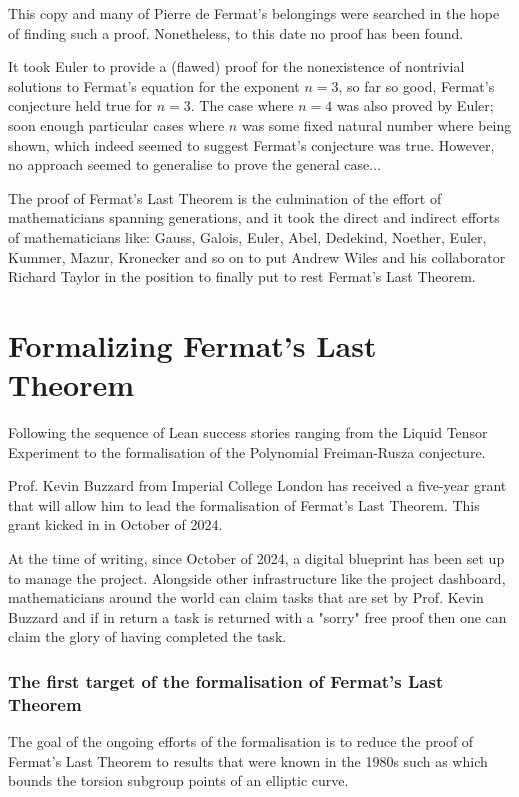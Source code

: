 This copy and many of Pierre de Fermat's belongings were searched in the hope of finding such a proof. Nonetheless, to this date no proof has been found.


It took Euler to provide a (flawed) proof for the nonexistence of nontrivial solutions to Fermat's equation for the exponent $n = 3$, so far so good, Fermat's conjecture held true for $n = 3$.
The case where $n = 4$ was also proved by Euler; soon enough particular cases where $n$ was some fixed natural number where being shown, which indeed seemed to suggest Fermat's conjecture was true.
However, no approach seemed to generalise to prove the general case...

The proof of Fermat's Last Theorem is the culmination of the effort of mathematicians spanning generations, and it took the direct and indirect efforts of mathematicians like: 
Gauss, Galois, Euler, Abel, Dedekind, Noether, Euler, Kummer, Mazur, Kronecker and so on to put Andrew Wiles and his collaborator Richard Taylor in the position 
to finally put to rest Fermat's Last Theorem.


\section{Formalizing Fermat's Last Theorem}

Following the sequence of Lean success stories ranging from the Liquid Tensor Experiment to the formalisation of the Polynomial Freiman-Rusza conjecture. 

Prof. Kevin Buzzard from Imperial College London has received a five-year grant that will allow him to lead the formalisation of Fermat's Last Theorem. This grant kicked in in October of 2024. 

At the time of writing, since October of 2024, a digital blueprint has been set up to manage the project. Alongside other infrastructure like the project dashboard, mathematicians around the world can 
claim tasks that are set by Prof. Kevin Buzzard and if in return a task is returned with a "sorry" free proof then one can claim the glory of having completed the task.

\subsubsection{The first target of the formalisation of Fermat's Last Theorem}

The goal of the ongoing efforts of the formalisation is to reduce the proof of Fermat's Last Theorem to results that were known in the 1980s such as  
which bounds the torsion subgroup points of an elliptic curve.

